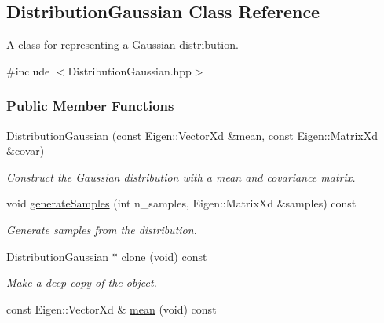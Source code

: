 \hypertarget{classDmpBbo_1_1DistributionGaussian}{\subsection{Distribution\+Gaussian Class Reference}
\label{classDmpBbo_1_1DistributionGaussian}
}


A class for representing a Gaussian distribution.  




{\ttfamily \#include $<$Distribution\+Gaussian.\+hpp$>$}

\subsubsection*{Public Member Functions}
\begin{DoxyCompactItemize}
\item 
\hyperlink{classDmpBbo_1_1DistributionGaussian_a429296bb71ed97282ef49232431b7b51}{Distribution\+Gaussian} (const Eigen\+::\+Vector\+Xd \&\hyperlink{classDmpBbo_1_1DistributionGaussian_a612f996501aac7e31237a21b47d03d72}{mean}, const Eigen\+::\+Matrix\+Xd \&\hyperlink{classDmpBbo_1_1DistributionGaussian_a5d2adde253815df42d471a876173868c}{covar})
\begin{DoxyCompactList}\small\item\em Construct the Gaussian distribution with a mean and covariance matrix. \end{DoxyCompactList}\item 
void \hyperlink{classDmpBbo_1_1DistributionGaussian_ae5cb5c89a2db5d549f7a2abec2cd58f8}{generate\+Samples} (int n\+\_\+samples, Eigen\+::\+Matrix\+Xd \&samples) const 
\begin{DoxyCompactList}\small\item\em Generate samples from the distribution. \end{DoxyCompactList}\item 
\hyperlink{classDmpBbo_1_1DistributionGaussian}{Distribution\+Gaussian} $\ast$ \hyperlink{classDmpBbo_1_1DistributionGaussian_a507b8f2538f519dd625025b1768f7938}{clone} (void) const 
\begin{DoxyCompactList}\small\item\em Make a deep copy of the object. \end{DoxyCompactList}\item 
const Eigen\+::\+Vector\+Xd \& \hyperlink{classDmpBbo_1_1DistributionGaussian_a612f996501aac7e31237a21b47d03d72}{mean} (void) const 

\end{DoxyCompactItemize}
